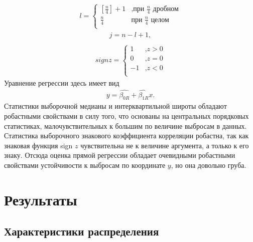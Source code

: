         \begin{gather}
            l = 
            \begin{cases} 
            [\frac{n}{4}] + 1 & \text{,при $\frac{n}{4}$ дробном}\\
            \frac{n}{4} & \text{при $\frac{n}{4}$ целом}\\
            \end{cases}
        \end{gather}
        \begin{gather}
            j = n - l + 1,\\
        \end{gather}
        \begin{gather}
            sign z = 
            \begin{cases}  1 & \text{,$z > 0$}\\
            0 & \text{,$z = 0$}\\
            -1 & \text{,$z < 0$}\\
            \end{cases} 
        \end{gather}
        Уравнение регрессии здесь имеет вид
        \begin{gather}
            y = \hat{\beta_{0R}} + \hat{\beta_{1R}}x.
        \end{gather}
        Статистики выборочной медианы и интерквартильной широты обладают робастными свойствами в силу того, что основаны на центральных порядковых статистиках, малочувствительных к большим по величине выбросам в данных. Статистика выборочного знакового коэффициента корреляции робастна, так как знаковая функция sign $z$ чувствительна не к величине аргумента, а только к его знаку. Отсюда оценка прямой регрессии обладает очевидными робастными свойствами устойчивости к выбросам по координате $y$, но она довольно груба.


    \section{Результаты}
    \subsection{Характеристики распределения}

